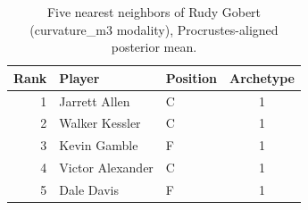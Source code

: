 \begin{table}[htbp]
  \centering\small
  \begin{tabular}{rllc}
    \toprule
    Rank & Player & Position & Archetype \\
    \midrule
    1 & Jarrett Allen & C & 1 \\
    2 & Walker Kessler & C & 1 \\
    3 & Kevin Gamble & F & 1 \\
    4 & Victor Alexander & C & 1 \\
    5 & Dale Davis & F & 1 \\
    \bottomrule
  \end{tabular}
  \caption{Five nearest neighbors of Rudy Gobert (curvature_m3 modality), Procrustes-aligned posterior mean.}
  \label{tab:Rudy_Gobert_neighbors_curvature_m3}
\end{table}

